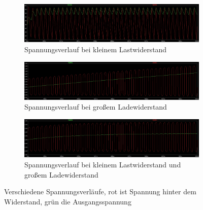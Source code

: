 \begin{figure}
	\centering
	\begin{subfigure}[b]{\textwidth}
		\centering
		\includegraphics[width=\textwidth]{data/kleinLast}
		\caption{Spannungsverlauf bei kleinem Lastwiderstand}
		\label{kleinLast}
	\end{subfigure}
	\begin{subfigure}[b]{\textwidth}
		\centering
		\includegraphics[width=\textwidth]{data/grossEin}
		\caption{Spannungsverlauf bei großem Ladewiderstand}
		\label{grossEin}
	\end{subfigure}
	\begin{subfigure}[b]{\textwidth}
		\centering
		\includegraphics[width=\textwidth]{data/grossEin_kleinLast}
		\caption{Spannungsverlauf bei kleinem Lastwiderstand und großem Ladewiderstand}
		\label{fig:groKlein}
	\end{subfigure}
\caption{Verschiedene Spannungsverläufe, rot ist Spannung hinter dem Widerstand, grün die Ausgangsspannung}
\end{figure}